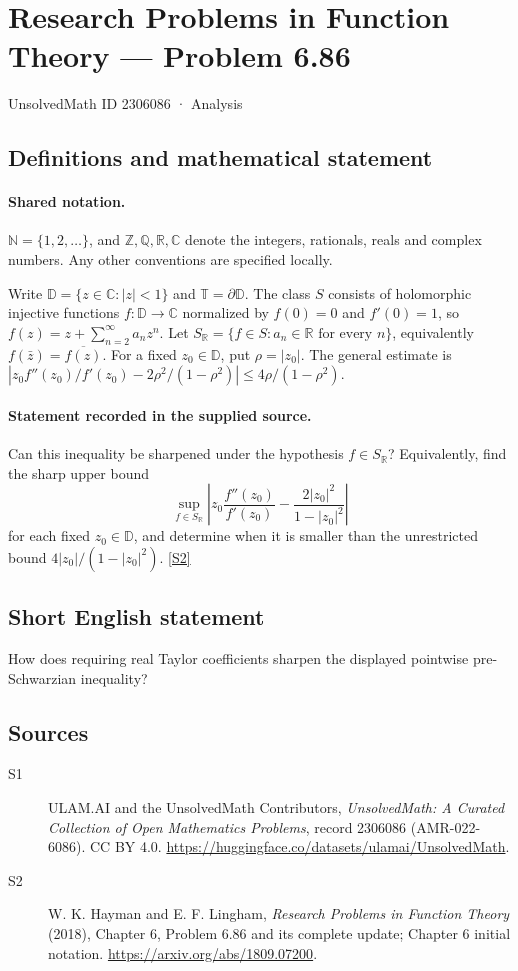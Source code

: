 \documentclass[11pt]{article}
\newcommand{\sref}[2]{\hyperlink{source:#1:#2}{[S#2]}}
\begin{document}
\setcounter{section}{2306085}
\section{Research Problems in Function Theory — Problem 6.86}\label{2306086}
{\small\sffamily UnsolvedMath ID 2306086 · Analysis}
\subsection{Definitions and mathematical statement}

\paragraph{Shared notation.}$\mathbb N=\{1,2,\ldots\}$, and $\mathbb Z,\mathbb Q,\mathbb R,\mathbb C$ denote the integers, rationals, reals and complex numbers. Any other conventions are specified locally.


Write $\mathbb D=\{z\in\mathbb C:|z|<1\}$ and $\mathbb T=\partial\mathbb D$. The class $S$ consists of holomorphic injective functions $f:\mathbb D\to\mathbb C$ normalized by $f(0)=0$ and $f'(0)=1$, so $f(z)=z+\sum_{n=2}^{\infty}a_nz^n$. Let $S_{\mathbb R}=\{f\in S:a_n\in\mathbb R\text{ for every }n\}$, equivalently $f(\bar z)=\overline{f(z)}$. For a fixed $z_0\in\mathbb D$, put $\rho=|z_0|$. The general estimate is $|z_0f''(z_0)/f'(z_0)-2\rho^2/(1-\rho^2)|\le4\rho/(1-\rho^2)$.
\paragraph{Statement recorded in the supplied source.}
Can this inequality be sharpened under the hypothesis $f\in S_{\mathbb R}$? Equivalently, find the sharp upper bound \[\sup_{f\in S_{\mathbb R}}\left|z_0\frac{f''(z_0)}{f'(z_0)}-\frac{2|z_0|^2}{1-|z_0|^2}\right|\] for each fixed $z_0\in\mathbb D$, and determine when it is smaller than the unrestricted bound $4|z_0|/(1-|z_0|^2)$. \sref{2306086}{2}
\subsection{Short English statement}
How does requiring real Taylor coefficients sharpen the displayed pointwise pre-Schwarzian inequality?
\subsection{Sources}
\begin{description}
\item[\hypertarget{source:2306086:1}{S1}] ULAM.AI and the UnsolvedMath Contributors, \emph{UnsolvedMath: A Curated Collection of Open Mathematics Problems}, record 2306086 (AMR-022-6086). CC BY 4.0. \url{https://huggingface.co/datasets/ulamai/UnsolvedMath}.
\item[\hypertarget{source:2306086:2}{S2}] W. K. Hayman and E. F. Lingham, \emph{Research Problems in Function Theory} (2018), Chapter 6, Problem 6.86 and its complete update; Chapter 6 initial notation. \url{https://arxiv.org/abs/1809.07200}.
\end{description}
\label{end:2306086}
\end{document}
